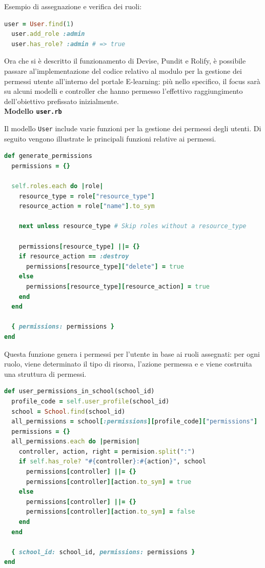 \documentclass[a4paper, 12pt]{book}
\begin{document}
Esempio di assegnazione e verifica dei ruoli:\\

\begin{lstlisting}[language=ruby, caption=Esempio assegnazione ruoli Rolify]
  user = User.find(1)
  user.add_role :admin
  user.has_role? :admin # => true
  \end{lstlisting}

\newpage

Ora che si è descritto il funzionamento di Devise, Pundit e Rolify, è possibile passare al'implementazione del codice
relativo al modulo per la gestione dei permessi utente all'interno del portale E-learning: più nello specifico, il focus
sarà su alcuni modelli e controller che hanno permesso l'effettivo raggiungimento dell'obiettivo prefissato inizialmente.\\

\textbf{Modello \texttt{user.rb}}

Il modello \texttt{User} include varie funzioni per la gestione dei permessi degli utenti. Di seguito
vengono illustrate le principali funzioni relative ai permessi.\\

\begin{lstlisting}[language=Ruby, caption=Funzione \texttt{generate\_permissions}]
def generate_permissions
  permissions = {}

  self.roles.each do |role|
    resource_type = role["resource_type"]
    resource_action = role["name"].to_sym

    next unless resource_type # Skip roles without a resource_type

    permissions[resource_type] ||= {}
    if resource_action == :destroy
      permissions[resource_type]["delete"] = true
    else
      permissions[resource_type][resource_action] = true
    end
  end

  { permissions: permissions }
end
\end{lstlisting}

Questa funzione genera i permessi per l'utente in base ai ruoli assegnati: per
ogni ruolo, viene determinato il tipo di risorsa, l'azione permessa e e viene costruita una struttura di permessi.

\begin{lstlisting}[language=Ruby, caption=Funzione \texttt{user\_permissions\_in\_school}]
def user_permissions_in_school(school_id)
  profile_code = self.user_profile(school_id)
  school = School.find(school_id)
  all_permissions = school[:permissions][profile_code]["permissions"]
  permissions = {}
  all_permissions.each do |permision|
    controller, action, right = permision.split(":")
    if self.has_role? "#{controller}:#{action}", school
      permissions[controller] ||= {}
      permissions[controller][action.to_sym] = true
    else
      permissions[controller] ||= {}
      permissions[controller][action.to_sym] = false
    end
  end

  { school_id: school_id, permissions: permissions }
end
\end{lstlisting}
\end{document}

